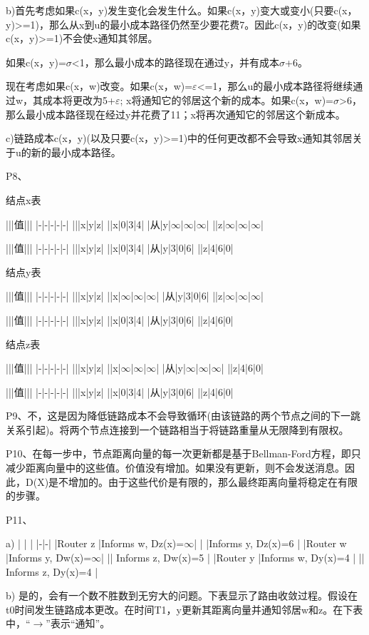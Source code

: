 \documentclass[11pt,UTF8,twoside]{article}
\begin{document}
	b)首先考虑如果c(x，y)发生变化会发生什么。如果c(x，y)变大或变小(只要c(x，y)>=1)，那么从x到u的最小成本路径仍然至少要花费7。因此c(x，y)的改变(如果c(x，y)>=1)不会使x通知其邻居。
	
	如果c(x，y)=$\sigma$<1，那么最小成本的路径现在通过y，并有成本$\sigma$+6。
	
	现在考虑如果c(x，w)改变。如果c(x，w)=$\varepsilon$<=1，那么u的最小成本路径将继续通过w，其成本将更改为5+$\varepsilon$; x将通知它的邻居这个新的成本。如果c(x，w)=$\sigma$>6，那么最小成本路径现在经过y并花费了11；x将再次通知它的邻居这个新成本。
	
	c)链路成本c(x，y)(以及只要c(x，y)>=1)中的任何更改都不会导致x通知其邻居关于u的新的最小成本路径。
	
	P8、
	
	结点x表
	
	|||值|||
	|-|-|-|-|-|
	|||x|y|z|
	||x|0|3|4|
	|从|y|$\infty$|$\infty$|$\infty$|
	||z|$\infty$|$\infty$|$\infty$|
	
	|||值|||
	|-|-|-|-|-|
	|||x|y|z|
	||x|0|3|4|
	|从|y|3|0|6|
	||z|4|6|0|
	
	结点y表
	
	|||值|||
	|-|-|-|-|-|
	|||x|y|z|
	||x|$\infty$|$\infty$|$\infty$|
	|从|y|3|0|6|
	||z|$\infty$|$\infty$|$\infty$|
	
	|||值|||
	|-|-|-|-|-|
	|||x|y|z|
	||x|0|3|4|
	|从|y|3|0|6|
	||z|4|6|0|
	
	结点z表
	
	|||值|||
	|-|-|-|-|-|
	|||x|y|z|
	||x|$\infty$|$\infty$|$\infty$|
	|从|y|$\infty$|$\infty$|$\infty$|
	||z|4|6|0|
	
	|||值|||
	|-|-|-|-|-|
	|||x|y|z|
	||x|0|3|4|
	|从|y|3|0|6|
	||z|4|6|0|
	
	P9、不，这是因为降低链路成本不会导致循环(由该链路的两个节点之间的下一跳关系引起)。将两个节点连接到一个链路相当于将链路重量从无限降到有限权。
	
	P10、在每一步中，节点距离向量的每一次更新都是基于Bellman-Ford方程，即只减少距离向量中的这些值。价值没有增加。如果没有更新，则不会发送消息。因此，D(X)是不增加的。由于这些代价是有限的，那么最终距离向量将稳定在有限的步骤。
	
	P11、
	
	a)
	| | |
	|-|-|
	|Router z |Informs w, Dz(x)=$\infty$|
	| |Informs y, Dz(x)=6 |
	|Router w |Informs y, Dw(x)=$\infty$|
	|| Informs z, Dw(x)=5 |
	|Router y |Informs w, Dy(x)=4 |
	|| Informs z, Dy(x)=4 |
	
	b) 是的，会有一个数不胜数到无穷大的问题。下表显示了路由收敛过程。假设在t0时间发生链路成本更改。在时间T1，y更新其距离向量并通知邻居w和z。在下表中，“$\to$”表示“通知”。
	
\end{document}

